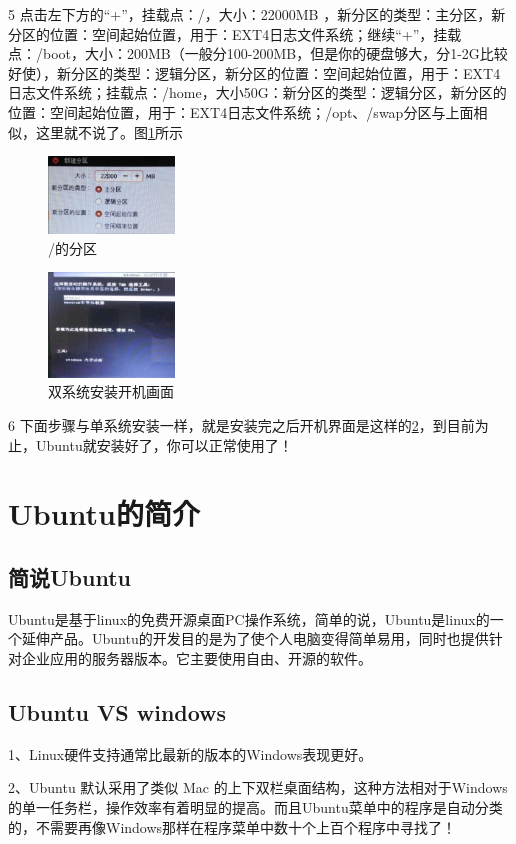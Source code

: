 \documentclass{article}
\begin{document}
5 点击左下方的“+”，挂载点：/，大小：22000MB ，新分区的类型：主分区，新分区的位置：空间起始位置，用于：EXT4日志文件系统；继续“+”，挂载点：/boot，大小：200MB（一般分100-200MB，但是你的硬盘够大，分1-2G比较好使），新分区的类型：逻辑分区，新分区的位置：空间起始位置，用于：EXT4日志文件系统；挂载点：/home，大小50G：新分区的类型：逻辑分区，新分区的位置：空间起始位置，用于：EXT4日志文件系统；/opt、/swap分区与上面相似，这里就不说了。图\ref{tu24}所示
\begin{figure}[!htb] %
\centering
\includegraphics[width=0.3\textwidth]{tu24.jpeg}
\caption{\small /的分区}
\label{tu24}
\end{figure} 
\begin{figure}[!htb] %
\centering
\includegraphics[width=0.3\textwidth]{tu25.jpeg}
\caption{\small 双系统安装开机画面}
\label{tu25}
\end{figure} 

6 下面步骤与单系统安装一样，就是安装完之后开机界面是这样的\ref{tu25}，到目前为止，Ubuntu就安装好了，你可以正常使用了！
\section{Ubuntu的简介}
\subsection{简说Ubuntu}
Ubuntu是基于linux的免费开源桌面PC操作系统，简单的说，Ubuntu是linux的一个延伸产品。Ubuntu的开发目的是为了使个人电脑变得简单易用，同时也提供针对企业应用的服务器版本。它主要使用自由、开源的软件。
\subsection{Ubuntu VS windows}
1、Linux硬件支持通常比最新的版本的Windows表现更好。

2、Ubuntu 默认采用了类似 Mac 的上下双栏桌面结构，这种方法相对于Windows的单一任务栏，操作效率有着明显的提高。而且Ubuntu菜单中的程序是自动分类的，不需要再像Windows那样在程序菜单中数十个上百个程序中寻找了！
\end{document}
